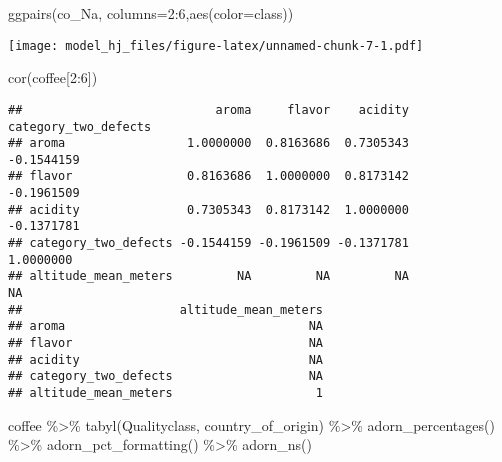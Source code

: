 \documentclass[
]{article}
\newenvironment{Shaded}{\begin{snugshade}}{\end{snugshade}}
\newcommand{\AttributeTok}[1]{\textcolor[rgb]{0.77,0.63,0.00}{#1}}
\newcommand{\DecValTok}[1]{\textcolor[rgb]{0.00,0.00,0.81}{#1}}
\newcommand{\FunctionTok}[1]{\textcolor[rgb]{0.00,0.00,0.00}{#1}}
\newcommand{\NormalTok}[1]{#1}
\newcommand{\SpecialCharTok}[1]{\textcolor[rgb]{0.00,0.00,0.00}{#1}}
\begin{document}
\begin{Shaded}
\begin{Highlighting}[]
\FunctionTok{ggpairs}\NormalTok{(co\_Na, }\AttributeTok{columns=}\DecValTok{2}\SpecialCharTok{:}\DecValTok{6}\NormalTok{,}\FunctionTok{aes}\NormalTok{(}\AttributeTok{color=}\NormalTok{class))}
\end{Highlighting}
\end{Shaded}

\texttt{[image: model\_hj\_files/figure-latex/unnamed-chunk-7-1.pdf]}

\begin{Shaded}
\begin{Highlighting}[]
\FunctionTok{cor}\NormalTok{(coffee[}\DecValTok{2}\SpecialCharTok{:}\DecValTok{6}\NormalTok{])}
\end{Highlighting}
\end{Shaded}

\begin{verbatim}
##                           aroma     flavor    acidity category_two_defects
## aroma                 1.0000000  0.8163686  0.7305343           -0.1544159
## flavor                0.8163686  1.0000000  0.8173142           -0.1961509
## acidity               0.7305343  0.8173142  1.0000000           -0.1371781
## category_two_defects -0.1544159 -0.1961509 -0.1371781            1.0000000
## altitude_mean_meters         NA         NA         NA                   NA
##                      altitude_mean_meters
## aroma                                  NA
## flavor                                 NA
## acidity                                NA
## category_two_defects                   NA
## altitude_mean_meters                    1
\end{verbatim}

\begin{Shaded}
\begin{Highlighting}[]
\NormalTok{coffee }\SpecialCharTok{\%\textgreater{}\%} 
  \FunctionTok{tabyl}\NormalTok{(Qualityclass, country\_of\_origin) }\SpecialCharTok{\%\textgreater{}\%} 
  \FunctionTok{adorn\_percentages}\NormalTok{() }\SpecialCharTok{\%\textgreater{}\%} 
  \FunctionTok{adorn\_pct\_formatting}\NormalTok{() }\SpecialCharTok{\%\textgreater{}\%} 
  \FunctionTok{adorn\_ns}\NormalTok{()}
\end{Highlighting}
\end{Shaded}
\end{document}
